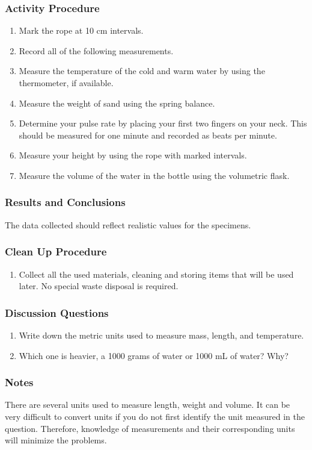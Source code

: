 \subsubsection*{Activity Procedure}
\begin{enumerate}
\item{Mark the rope at 10 cm intervals.}
\item{Record all of the following measurements.}
\item{Measure the temperature of the cold and warm water by using the thermometer, if available.}
\item{Measure the weight of sand using the spring balance.}
\item{Determine your pulse rate by placing your first two fingers on your neck. This should be measured for one minute and recorded as beats per minute.}
\item{Measure your height by using the rope with marked intervals.}
\item{Measure the volume of the water in the bottle using the volumetric flask.}
\end{enumerate}

\subsubsection*{Results and Conclusions}
The data collected should reflect realistic values for the specimens. 

\subsubsection*{Clean Up Procedure}
\begin{enumerate}
\item{Collect all the used materials, cleaning and storing items that will be used later. No special waste disposal is required.}
\end{enumerate}

\subsubsection*{Discussion Questions}
\begin{enumerate}
\item{Write down the metric units used to measure mass, length, and temperature.}
\item{Which one is heavier, a 1000 grams of water or 1000 mL of water? Why?}
\end{enumerate}

\subsubsection*{Notes}
There are several units used to measure length, weight and volume. It can be very difficult to convert units if you do not first identify the unit measured in the question. Therefore, knowledge of measurements and their corresponding units will minimize the problems.